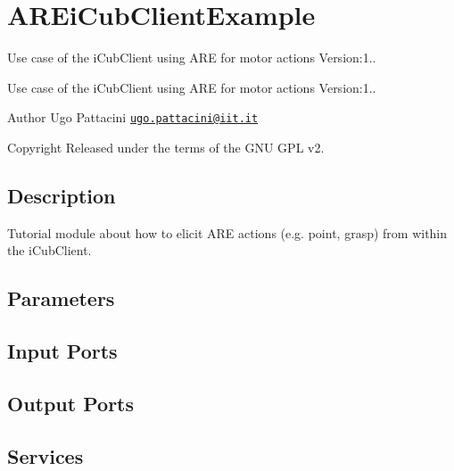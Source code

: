 \hypertarget{group__AREiCubClientExample}{}\section{A\+R\+Ei\+Cub\+Client\+Example}
\label{group__AREiCubClientExample}


Use case of the i\+Cub\+Client using A\+RE for motor actions Version\+:1..  


Use case of the i\+Cub\+Client using A\+RE for motor actions Version\+:1.. 

\begin{DoxyAuthor}{Author}
Ugo Pattacini \href{mailto:ugo.pattacini@iit.it}{\tt ugo.\+pattacini@iit.\+it} ~\newline
 
\end{DoxyAuthor}
\begin{DoxyCopyright}{Copyright}
Released under the terms of the G\+NU G\+PL v2. 
\end{DoxyCopyright}
\hypertarget{group__touchDetector_intro_sec}{}\subsection{Description}\label{group__touchDetector_intro_sec}
Tutorial module about how to elicit A\+RE actions (e.\+g. point, grasp) from within the i\+Cub\+Client.\hypertarget{group__touchDetector_parameters_sec}{}\subsection{Parameters}\label{group__touchDetector_parameters_sec}
\hypertarget{group__touchDetector_inputports_sec}{}\subsection{Input Ports}\label{group__touchDetector_inputports_sec}
\hypertarget{group__touchDetector_outputports_sec}{}\subsection{Output Ports}\label{group__touchDetector_outputports_sec}
\hypertarget{group__touchDetector_services_sec}{}\subsection{Services}\label{group__touchDetector_services_sec}
